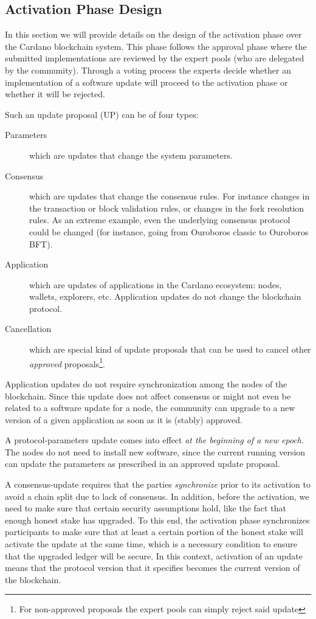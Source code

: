 \subsection{Activation Phase Design}\label{activation_phase_design}
In this section we will provide details on the design of the activation phase
over the Cardano blockchain system.
%
This phase follows the approval phase where the submitted implementations are
reviewed by the expert pools (who are delegated by the community).
%
Through a voting process the experts decide whether an implementation of a
software update will proceed to the activation phase or whether it will be
rejected.

Such an update proposal (UP) can be of four types:
\begin{description}
	\item[Parameters] which are updates that change the system parameters.
	\item[Consensus] which are updates that change the consensus rules. For
	instance
	changes in the transaction or block validation rules, or changes in the fork
	resolution rules. As an extreme example, even the underlying consensus
	protocol could be changed (for instance, going from Ouroboros classic to
	Ouroboros BFT).
	\item[Application] which are updates of applications in the Cardano
	ecosystem:
	nodes, wallets, explorers, etc. Application updates do not change the
	blockchain protocol.
	\item[Cancellation] which are special kind of update proposals that can be
	used
	to cancel other \emph{approved} proposals\footnote{For non-approved
	proposals
		the expert pools can simply reject said update}.
\end{description}

Application updates do not require synchronization among the nodes of the
blockchain. Since this update does not affect consensus or might not even be
related to a software update for a node, the community can upgrade to a new
version of a given application as soon as it is (stably) approved.

A protocol-parameters update comes into effect \emph{at the beginning of a new
	epoch}. The nodes do not need to install new software, since the current
running version can update the parameters as prescribed in an approved update
proposal.

A consensus-update requires that the parties \emph{synchronize} prior to its
activation to avoid a chain split due to lack of consensus. In addition, before
the activation, we need to make sure that certain security assumptions hold,
like the fact that enough honest stake has upgraded.
%
To this end, the activation phase synchronizes participants to make sure that at
least a certain portion of the honest stake will activate the update at the same
time, which is a necessary condition to ensure that the upgraded ledger will be
secure.
%
In this context, activation of an update means that the protocol version that it
specifies becomes the current version of the blockchain.


